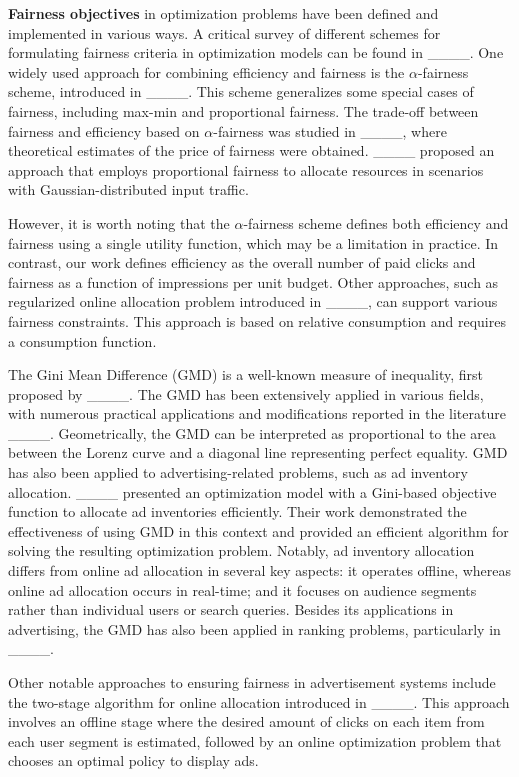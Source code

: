 \textbf{Fairness objectives} in optimization problems have been defined and implemented in various ways. A critical survey of different schemes for formulating fairness criteria in optimization models can be found in ____. One widely used approach for combining efficiency and fairness is the $\alpha$-fairness scheme, introduced in ____. This scheme generalizes some special cases of fairness, including max-min and proportional fairness. The trade-off between fairness and efficiency based on $\alpha$-fairness was studied in ____, where theoretical estimates of the price of fairness were obtained. ____ proposed an approach that employs proportional fairness to allocate resources in scenarios with Gaussian-distributed input traffic.

However, it is worth noting that the $\alpha$-fairness scheme defines both efficiency and fairness using a single utility function, which may be a limitation in practice. In contrast, our work defines efficiency as the overall number of paid clicks and fairness as a function of impressions per unit budget. Other approaches, such as regularized online allocation problem introduced in ____, can support various fairness constraints. This approach is based on relative consumption and requires a consumption function.

The Gini Mean Difference (GMD) is a well-known measure of inequality, first proposed by ____. The GMD has been extensively applied in various fields, with numerous practical applications and modifications reported in the literature ____. Geometrically, the GMD can be interpreted as proportional to the area between the Lorenz curve and a diagonal line representing perfect equality. GMD has also been applied to advertising-related problems, such as ad inventory allocation. ____ presented an optimization model with a Gini-based objective function to allocate ad inventories efficiently. Their work demonstrated the effectiveness of using GMD in this context and provided an efficient algorithm for solving the resulting optimization problem. Notably, ad inventory allocation differs from online ad allocation in several key aspects: it operates offline, whereas online ad allocation occurs in real-time; and it focuses on audience segments rather than individual users or search queries. Besides its applications in advertising, the GMD has also been applied in ranking problems, particularly in ____.

Other notable approaches to ensuring fairness in advertisement systems include the two-stage algorithm for online allocation introduced in ____. This approach involves an offline stage where the desired amount of clicks on each item from each user segment is estimated, followed by an online optimization problem that chooses an optimal policy to display ads.
